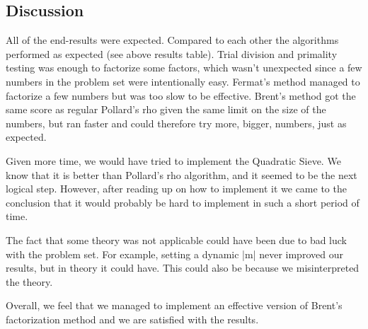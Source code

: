 \documentclass[paper=a4, fontsize=11pt,numbers=endperiod]{scrartcl} %
\numberwithin{equation}{section} %
\numberwithin{figure}{section} %
\numberwithin{table}{section} %
\begin{document}
{%


\subsection{Discussion}

All of the end-results were expected.
Compared to each other the algorithms performed as expected (see above results table).
Trial division and primality testing was enough to factorize some factors, which wasn't unexpected since a few numbers in the problem set were intentionally easy.
Fermat's method managed to factorize a few numbers but was too slow to be effective.
Brent's method got the same score as regular Pollard's rho given the same limit on the size of the numbers, but ran faster and could therefore try more, bigger, numbers, just as expected.

Given more time, we would have tried to implement the Quadratic Sieve.
We know that it is better than Pollard's rho algorithm, and it seemed to be the next logical step.
However, after reading up on how to implement it we came to the conclusion that it would probably be hard to implement in such a short period of time.

The fact that some theory was not applicable could have been due to bad luck with the problem set. For example, setting a dynamic |m| never improved our results, but in theory it could have. This could also be because we misinterpreted the theory.

Overall, we feel that we managed to implement an effective version of Brent's factorization method and we are satisfied with the results.


\newpage
\begin{thebibliography}{9}


\end{thebibliography}}
\end{document}

